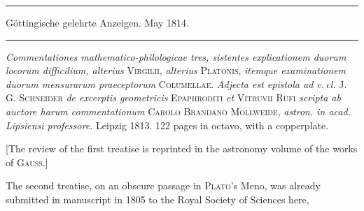 \begin{center}
\rule{.85\textwidth}{.3pt}\par
Göttingische gelehrte Anzeigen. May 1814.\par
\rule{.85\textwidth}{.3pt}
\end{center}
\hspace*{\parindent}\textit{Commentationes mathematico-philologicae tres, sistentes explicationem duorum locorum difficilium, alterius} \textsc{Virgilii}, \textit{alterius} \textsc{Platonis}, \textit{itemque examinationem duorum mensurarum praeceptorum} \textsc{Columellae}. \textit{Adjecta est epistola ad v.\,cl.} J. G. \textsc{Schneider} \textit{de excerptis geometricis} \textsc{Epaphroditi} \textit{et} \textsc{Vitruvii Rufi} \textit{scripta ab auctore harum commentationum} \textsc{Carolo Brandano Mollweide}, \textit{astron. in acad. Lipsiensi professore.} Leipzig 1813. 122 pages in octavo, with a copperplate.

[The review of the first treatise is reprinted in the astronomy volume of the works of \textsc{Gauss}.]

The second treatise, on an obscure passage in \textsc{Plato}’s Meno, was already submitted in manuscript in 1805 to the Royal Society of Sciences here, %
